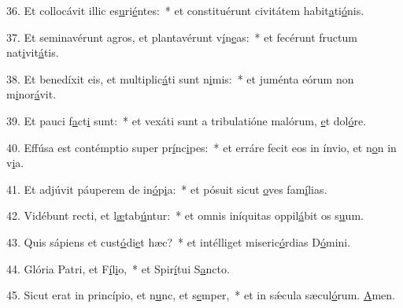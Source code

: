 36. Et collocávit illic es\uline{u}ri\uline{é}ntes:~* et constituérunt civitátem habit\uline{a}ti\uline{ó}nis.\par 
37. Et seminavérunt agros, et plantavérunt v\uline{í}n\uline{e}as:~* et fecérunt fructum nat\uline{i}vit\uline{á}tis.\par 
38. Et benedíxit eis, et multiplic\uline{á}ti sunt n\uline{i}mis:~* et juménta eórum non m\uline{i}nor\uline{á}vit.\par 
39. Et pauci f\uline{a}ct\uline{i} sunt:~* et vexáti sunt a tribulatióne malórum, \uline{e}t dol\uline{ó}re.\par 
40. Effúsa est contémptio super pr\uline{í}nc\uline{i}pes:~* et erráre fecit eos in ínvio, et n\uline{o}n in v\uline{i}a.\par 
41. Et adjúvit páuperem de in\uline{ó}p\uline{i}a:~* et pósuit sicut \uline{o}ves fam\uline{í}lias.\par 
42. Vidébunt recti, et l\uline{æ}tab\uline{ú}ntur:~* et omnis iníquitas oppil\uline{á}bit os s\uline{u}um.\par 
43. Quis sápiens et cust\uline{ó}di\uline{e}t hæc?~* et intélliget miseric\uline{ó}rdias D\uline{ó}mini.\par 
44. Glória Patri, et F\uline{í}l\uline{i}o,~* et Spir\uline{í}tui S\uline{a}ncto.\par 
45. Sicut erat in princípio, et n\uline{u}nc, et s\uline{e}mper,~* et in sǽcula sæcul\uline{ó}rum. \uline{A}men.\par 
